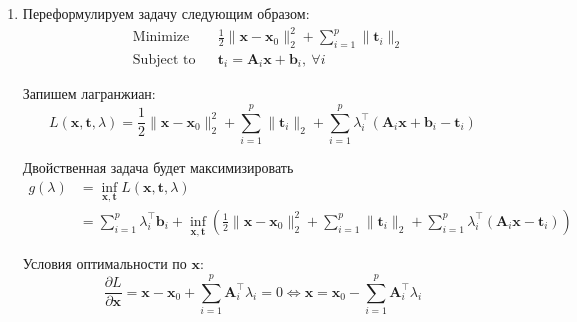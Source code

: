\documentclass{article}
\begin{document}
\begin{enumerate}
\begin{itemize}
\begin{align*}
			      \end{align*}
			      При ограничении
			      \[
				      \lambda > 3
			      \]
			      Тогда двойственная задача будет:
			      \begin{equation*}
				      \begin{aligned}
					       & \text{Maximize}   &  & -\lambda + 3 + 2 \left(
					      \frac{1}{3 - \lambda} -
					      \frac{1}{1 + \lambda} -
					      \frac{1}{2 + \lambda} \right)                     \\
					       & \text{Subject to} &  & \lambda > 3
				      \end{aligned}
			      \end{equation*}
	      \end{itemize}

	\item Переформулируем задачу следующим образом:
	      \begin{equation*}
		      \begin{aligned}
			       & \text{Minimize}   &  &
			      \frac{1}{2}
			      \| \mathbf{x} - \mathbf{x}_0 \|_2^2 +
			      \sum_{i=1}^p \| \mathbf{t}_i \|_2 \\
			       & \text{Subject to} &  &
			      \mathbf{t}_i = \mathbf{A}_i \mathbf{x} +
			      \mathbf{b}_i, \ \forall i
		      \end{aligned}
	      \end{equation*}

	      Запишем лагранжиан:
	      \[
		      L(\mathbf{x}, \mathbf{t}, \lambda) =
		      \frac{1}{2} \| \mathbf{x} - \mathbf{x}_0 \|_2^2 +
		      \sum_{i=1}^p \| \mathbf{t}_i \|_2 +
		      \sum_{i=1}^p \lambda_i^\top \left(
		      \mathbf{A}_i \mathbf{x} +
		      \mathbf{b}_i - \mathbf{t}_i \right)
	      \]

	      Двойственная задача будет максимизировать
	      \begin{align*}
		      g(\lambda) & = \inf_{\mathbf{x}, \mathbf{t}}
		      L(\mathbf{x}, \mathbf{t}, \lambda)           \\
		                 & =
		      \sum_{i=1}^p \lambda_i^\top \mathbf{b}_i +
		      \inf_{\mathbf{x}, \mathbf{t}}
		      \left( \frac{1}{2}
		      \| \mathbf{x} - \mathbf{x}_0 \|_2^2 +
		      \sum_{i=1}^p \| \mathbf{t}_i \|_2 +
		      \sum_{i=1}^p \lambda_i^\top \left(
			      \mathbf{A}_i \mathbf{x}
			      - \mathbf{t}_i \right) \right)
	      \end{align*}

	      Условия оптимальности по $\mathbf{x}$:
	      \[
		      \frac{\partial L}{\partial \mathbf{x}} =
		      \mathbf{x} - \mathbf{x}_0 +
		      \sum_{i=1}^p \mathbf{A}_i^\top \lambda_i = 0
		      \iff \mathbf{x} = \mathbf{x}_0 -
		      \sum_{i=1}^p \mathbf{A}_i^\top \lambda_i
	      \]


\end{enumerate}
\end{document}
